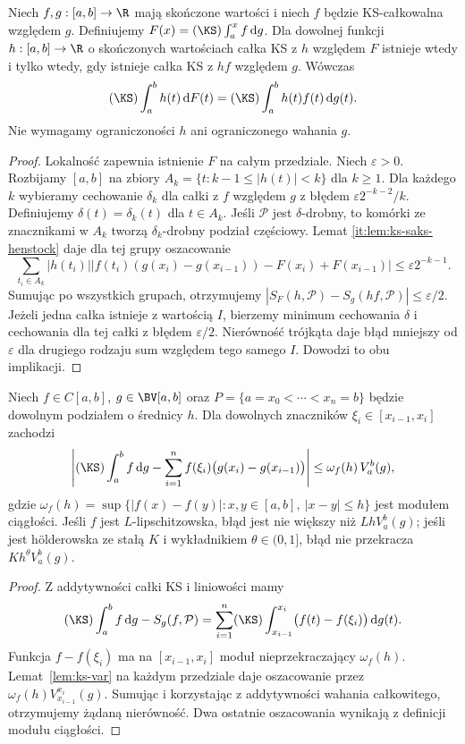 \begin{twierdzenie}
\label{tw:ks-chain}
Niech $f,g:[a,b]\to\R$ mają skończone wartości i niech
$f$ będzie KS-całkowalna względem $g$. Definiujemy
$F(x)=(\KS)\int_a^x f\,\mathrm dg$. Dla dowolnej funkcji
$h:[a,b]\to\R$ o skończonych wartościach całka KS z $h$
względem $F$ istnieje wtedy i tylko wtedy, gdy istnieje
całka KS z $hf$ względem $g$. Wówczas
\[
 (\KS)\int_a^b h(t)\,\mathrm dF(t)
 =(\KS)\int_a^b h(t)f(t)\,\mathrm dg(t).
\]
Nie wymagamy ograniczoności $h$ ani ograniczonego wahania $g$.
\end{twierdzenie}
\begin{proof}
Lokalność zapewnia istnienie $F$ na całym przedziale.
Niech $\varepsilon>0$. Rozbijamy $[a,b]$ na zbiory
$A_k=\{t:k-1\le|h(t)|<k\}$ dla $k\ge1$.
Dla każdego $k$ wybieramy cechowanie $\delta_k$ dla
całki z $f$ względem $g$ z błędem
$\varepsilon2^{-k-2}/k$.
Definiujemy $\delta(t)=\delta_k(t)$ dla $t\in A_k$.
Jeśli $\mathcal P$ jest $\delta$-drobny, to komórki
ze znacznikami w $A_k$ tworzą $\delta_k$-drobny
podział częściowy. Lemat \ref{it:lem:ks-saks-henstock}
daje dla tej grupy oszacowanie
\[
 \sum_{t_i\in A_k}|h(t_i)|
 |f(t_i)(g(x_i)-g(x_{i-1}))-F(x_i)+F(x_{i-1})|
 \le\varepsilon2^{-k-1}.
\]
Sumując po wszystkich grupach, otrzymujemy
$|S_F(h,\mathcal P)-S_g(hf,\mathcal P)|\le\varepsilon/2$.
Jeżeli jedna całka istnieje z wartością $I$, bierzemy
minimum cechowania $\delta$ i cechowania dla tej całki
z błędem $\varepsilon/2$. Nierówność trójkąta daje
błąd mniejszy od $\varepsilon$ dla drugiego rodzaju sum
względem tego samego $I$. Dowodzi to obu implikacji.
\end{proof}

\begin{twierdzenie}
\label{tw:ks-quadrature}
Niech $f\in C[a,b]$, $g\in\BV[a,b]$ oraz $P=\{a=x_0<\cdots<x_n=b\}$ będzie dowolnym podziałem o średnicy $h$. Dla dowolnych znaczników $\xi_i\in[x_{i-1},x_i]$ zachodzi
\[
 \left|(\KS)\int_a^b f\,\mathrm dg-
 \sum_{i=1}^n f(\xi_i)\bigl(g(x_i)-g(x_{i-1})\bigr)\right|
 \le\omega_f(h)\,V_a^b(g),
\]
gdzie $\omega_f(h)=\sup\{|f(x)-f(y)|:x,y\in[a,b],\ |x-y|\le h\}$ jest modułem ciągłości. Jeśli $f$ jest $L$-lipschitzowska, błąd jest nie większy niż $LhV_a^b(g)$; jeśli jest h\"olderowska ze stałą $K$ i wykładnikiem $\theta\in(0,1]$, błąd nie przekracza $Kh^\theta V_a^b(g)$.
\end{twierdzenie}
\begin{proof}
Z addytywności całki KS i liniowości mamy
\[
 (\KS)\int_a^b f\,\mathrm dg-S_g(f,\mathcal P)
 =\sum_{i=1}^n(\KS)\int_{x_{i-1}}^{x_i}\bigl(f(t)-f(\xi_i)\bigr)\,\mathrm dg(t).
\]
Funkcja $f-f(\xi_i)$ ma na $[x_{i-1},x_i]$ moduł nieprzekraczający $\omega_f(h)$. Lemat~\ref{lem:ks-var} na każdym przedziale daje oszacowanie przez $\omega_f(h)V_{x_{i-1}}^{x_i}(g)$. Sumując i korzystając z addytywności wahania całkowitego, otrzymujemy żądaną nierówność. Dwa ostatnie oszacowania wynikają z definicji modułu ciągłości.
\end{proof}

